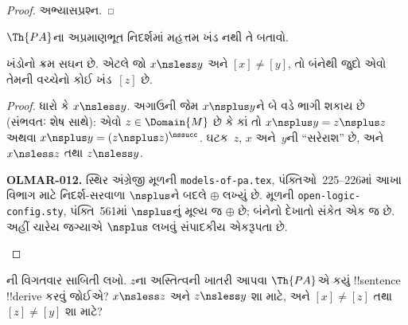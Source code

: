 \documentclass[../../../include/open-logic-section]{subfiles}
\begin{document}
\begin{proof}
અભ્યાસપ્રશ્ન.
\end{proof}

\begin{prob}
$\Th{PA}$ના અપ્રમાણભૂત નિદર્શમાં મહત્તમ ખંડ નથી તે બતાવો.
\end{prob}

\begin{prop}
ખંડોનો ક્રમ સઘન છે. એટલે જો $x\nsless y$ અને $[x]\neq[y]$, તો બંનેથી
જુદો એવો તેમની વચ્ચેનો કોઈ ખંડ~$[z]$ છે.
\end{prop}

\begin{proof}
ધારો કે $x\nsless y$. અગાઉની જેમ $x\nsplus y$ને બે વડે ભાગી શકાય છે
(સંભવતઃ શેષ સાથે): એવો $z\in\Domain{M}$ છે કે કાં તો
$x\nsplus y=z\nsplus z$ અથવા
$x\nsplus y=(z\nsplus z)^\nssucc$. ઘટક~$z$, $x$ અને~$y$ની
``સરેરાશ'' છે, અને $x\nsless z$ તથા $z\nsless y$.
\begin{editorial}
\textbf{OLMAR-012.} સ્થિર અંગ્રેજી મૂળની \texttt{models-of-pa.tex}, પંક્તિઓ~225--226માં આખા વિભાગ માટે નિદર્શ-સરવાળા $\nsplus$ને બદલે $\oplus$ લખ્યું છે. મૂળની \texttt{open-logic-config.sty}, પંક્તિ~561માં $\nsplus$નું મૂલ્ય જ $\oplus$ છે; બંનેનો દેખાતો સંકેત એક જ છે. અહીં ચારેય જગ્યાએ $\nsplus$ લખવું સંપાદકીય એકરૂપતા છે.
\end{editorial}
\end{proof}

\begin{prob}
ની વિગતવાર સાબિતી લખો.
$z$ના અસ્તિત્વની ખાતરી આપવા $\Th{PA}$એ કયું !!{sentence} !!{derive}
કરવું જોઈએ? $x\nsless z$ અને $z\nsless y$ શા માટે, અને
$[x]\neq[z]$ તથા $[z]\neq[y]$ શા માટે?
\end{prob}
\end{document}
